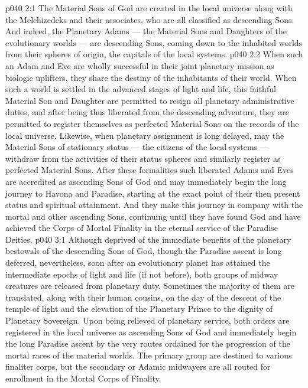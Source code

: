 \vs p040 2:1 The Material Sons of God are created in the local universe along with the Melchizedeks and their associates, who are all classified as descending Sons. And indeed, the Planetary Adams --- the Material Sons and Daughters of the evolutionary worlds --- are descending Sons, coming down to the inhabited worlds from their spheres of origin, the capitals of the local systems.
\vs p040 2:2 When such an Adam and Eve are wholly successful in their joint planetary mission as biologic uplifters, they share the destiny of the inhabitants of their world. When such a world is settled in the advanced stages of light and life, this faithful Material Son and Daughter are permitted to resign all planetary administrative duties, and after being thus liberated from the descending adventure, they are permitted to register themselves as perfected Material Sons on the records of the local universe. Likewise, when planetary assignment is long delayed, may the Material Sons of stationary status --- the citizens of the local systems --- withdraw from the activities of their status spheres and similarly register as perfected Material Sons. After these formalities such liberated Adams and Eves are accredited as ascending Sons of God and may immediately begin the long journey to Havona and Paradise, starting at the exact point of their then present status and spiritual attainment. And they make this journey in company with the mortal and other ascending Sons, continuing until they have found God and have achieved the Corps of Mortal Finality in the eternal service of the Paradise Deities.
\vs p040 3:1 Although deprived of the immediate benefits of the planetary bestowals of the descending Sons of God, though the Paradise ascent is long deferred, nevertheless, soon after an evolutionary planet has attained the intermediate epochs of light and life (if not before), both groups of midway creatures are released from planetary duty. Sometimes the majority of them are translated, along with their human cousins, on the day of the descent of the temple of light and the elevation of the Planetary Prince to the dignity of Planetary Sovereign. Upon being relieved of planetary service, both orders are registered in the local universe as ascending Sons of God and immediately begin the long Paradise ascent by the very routes ordained for the progression of the mortal races of the material worlds. The primary group are destined to various finaliter corps, but the secondary or Adamic midwayers are all routed for enrollment in the Mortal Corps of Finality.
